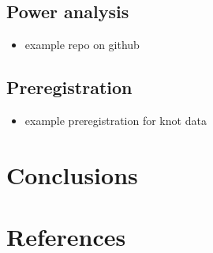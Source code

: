 \documentclass[
  man,floatsintext]{apa6}
\providecommand{\tightlist}{%
  \setlength{\itemsep}{0pt}\setlength{\parskip}{0pt}}
\begin{document}
\subsection{Power analysis}\label{power-analysis}

\begin{itemize}
\tightlist
\item
  example repo on github
\end{itemize}

\subsection{Preregistration}\label{preregistration}

\begin{itemize}
\tightlist
\item
  example preregistration for knot data
\end{itemize}

\section{Conclusions}\label{conclusions}

\newpage

\section{References}\label{references}
\end{document}
